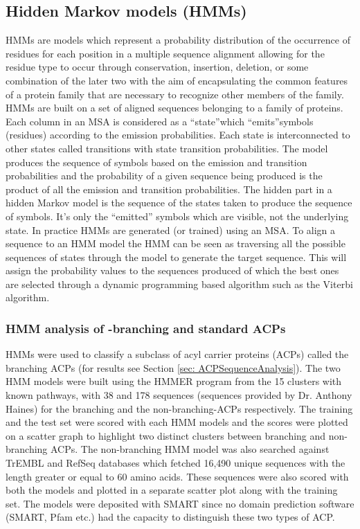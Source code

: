 		\subsection{Hidden Markov models (HMMs)}
		\label{sec:HMM}
		HMMs are models which represent a probability distribution of the occurrence of residues for each position in a multiple sequence alignment allowing for the residue type to occur through conservation, insertion, deletion, or some combination of the later two with the aim of encapsulating the common features of a protein family that are necessary to recognize other members of the family. HMMs are built on a set of aligned sequences belonging to a family of proteins. Each column in an MSA is considered as a \textquotedblleft state\textquotedblright which \textquotedblleft emits\textquotedblright symbols (residues) according to the emission probabilities. Each state is interconnected to other states called transitions with state transition probabilities. The model produces the sequence of symbols based on the emission and transition probabilities and the probability of a given sequence being produced is the product of all the emission and transition probabilities. The hidden part in a hidden Markov model is the sequence of the states taken to produce the sequence of symbols. It’s only the “emitted” symbols which are visible, not the underlying state. In practice HMMs are generated (or trained) using an MSA. To align a sequence to an HMM model the HMM can be seen as traversing all the possible sequences of states through the model to generate the target sequence. This will assign the probability values to the sequences produced of which the best ones are selected through a dynamic programming based algorithm such as the Viterbi algorithm.
		
		\subsubsection{HMM analysis of \bet-branching and standard ACPs}
		\label{sec:HMMACPs}
		HMMs were used to classify a subclass of acyl carrier proteins (ACPs) called the branching ACPs (for results see Section \ref{sec: ACPSequenceAnalysis}). The two HMM models were built using the HMMER program from the 15 clusters with known pathways, with 38 and 178 sequences (sequences provided by Dr. Anthony Haines) for the branching and the non-branching-ACPs respectively. The training and the test set were scored with each HMM models and the scores were plotted on a scatter graph to highlight two distinct clusters between branching and non-branching ACPs. The non-branching HMM model was also searched against TrEMBL and RefSeq databases which fetched 16,490 unique sequences with the length greater or equal to 60 amino acids. These sequences were also scored with both the models and plotted in a separate scatter plot along with the training set.  The models were deposited with SMART since no domain prediction software (SMART, Pfam etc.) had the capacity to distinguish these two types of ACP.
	
